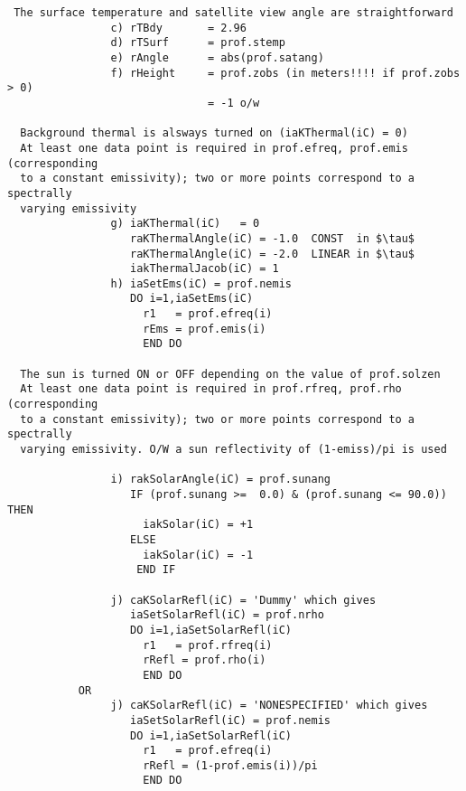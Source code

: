 \documentclass[12pt]{article}
\begin{document}
{\begin{verbatim}
 The surface temperature and satellite view angle are straightforward
                c) rTBdy       = 2.96 
                d) rTSurf      = prof.stemp  
                e) rAngle      = abs(prof.satang)  
                f) rHeight     = prof.zobs (in meters!!!! if prof.zobs > 0)
                               = -1 o/w

  Background thermal is alsways turned on (iaKThermal(iC) = 0)
  At least one data point is required in prof.efreq, prof.emis (corresponding
  to a constant emissivity); two or more points correspond to a spectrally
  varying emissivity
                g) iaKThermal(iC)   = 0  
                   raKThermalAngle(iC) = -1.0  CONST  in $\tau$
                   raKThermalAngle(iC) = -2.0  LINEAR in $\tau$		   
                   iakThermalJacob(iC) = 1  
                h) iaSetEms(iC) = prof.nemis  
                   DO i=1,iaSetEms(iC)   
                     r1   = prof.efreq(i)  
                     rEms = prof.emis(i)  
                     END DO 

  The sun is turned ON or OFF depending on the value of prof.solzen
  At least one data point is required in prof.rfreq, prof.rho (corresponding
  to a constant emissivity); two or more points correspond to a spectrally
  varying emissivity. O/W a sun reflectivity of (1-emiss)/pi is used

                i) rakSolarAngle(iC) = prof.sunang
                   IF (prof.sunang >=  0.0) & (prof.sunang <= 90.0)) THEN  
                     iakSolar(iC) = +1   
                   ELSE   
                     iakSolar(iC) = -1  
                    END IF  

                j) caKSolarRefl(iC) = 'Dummy' which gives  
                   iaSetSolarRefl(iC) = prof.nrho
                   DO i=1,iaSetSolarRefl(iC)   
                     r1   = prof.rfreq(i)  
                     rRefl = prof.rho(i)  
                     END DO 
           OR
                j) caKSolarRefl(iC) = 'NONESPECIFIED' which gives  
                   iaSetSolarRefl(iC) = prof.nemis
                   DO i=1,iaSetSolarRefl(iC)   
                     r1   = prof.efreq(i)  
                     rRefl = (1-prof.emis(i))/pi
                     END DO 
\end{verbatim}

}
\end{document}
